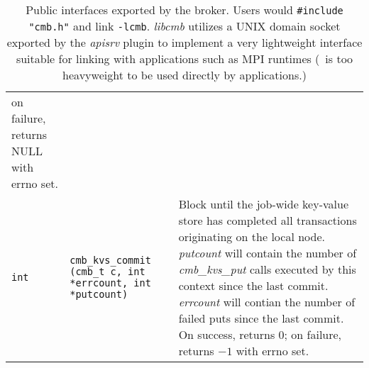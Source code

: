 \begin{table}
\begin{tabular}{|p{0.7cm}p{5cm}|p{9cm}|}
    on failure, returns NULL with errno set.\\
{\tt int}
  & {\tt cmb\_kvs\_commit (cmb\_t c, int *errcount, int *putcount)}
  & Block until the job-wide key-value store has completed all transactions
    originating on the local node.  {\em putcount} will contain the number
    of {\em cmb\_kvs\_put} calls executed by this context since the last commit.
    {\em errcount} will contian the number of failed puts since the last commit.
    On success, returns $0$; on failure, returns $-1$ with errno set.\\
\hline
\end{tabular}
\caption{Public interfaces exported by the broker.  Users would
{\tt \#include "cmb.h"} and link {\tt -lcmb}.  {\em libcmb} utilizes
a UNIX domain socket exported by the {\em apisrv} plugin to implement
a very lightweight interface suitable for linking with applications such
as MPI runtimes (\zMQ\ is too heavyweight to be used directly by applications.)}
\label{tab:cmbapi}
\end{table}


